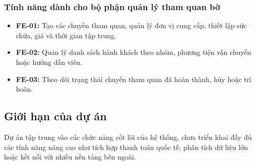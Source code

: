 \subsubsection{Tính năng dành cho bộ phận quản lý tham quan bờ}
\begin{itemize}
    \item \textbf{FE-01:} Tạo các chuyến tham quan, quản lý đơn vị cung cấp, thiết lập sức chứa, giá và thời gian tập trung.
    \item \textbf{FE-02:} Quản lý danh sách hành khách theo nhóm, phương tiện vận chuyển hoặc hướng dẫn viên.
    \item \textbf{FE-03:} Theo dõi trạng thái chuyến tham quan đã hoàn thành, hủy hoặc trì hoãn.
\end{itemize}

\subsection{Giới hạn của dự án}
Dự án tập trung vào các chức năng cốt lõi của hệ thống, chưa triển khai đầy đủ các tính năng nâng cao như tích hợp thanh toán quốc tế, phân tích dữ liệu lớn hoặc kết nối với nhiều nền tảng bên ngoài.
